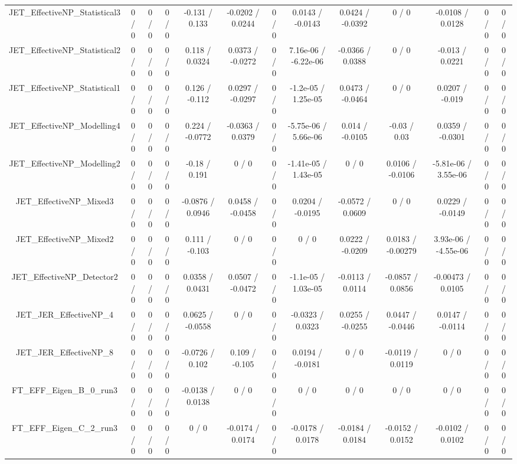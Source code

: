 \documentclass[10pt]{article}
\begin{document}
\begin{table}[htbp]
\begin{center}
\begin{tabular}{|c|c|c|c|c|c|c|c|c|c|c|c|c|}
  JET_EffectiveNP_Statistical3 & 0 / 0 & 0 / 0 & 0 / 0 & -0.131 / 0.133 & -0.0202 / 0.0244 & 0 / 0 & 0.0143 / -0.0143 & 0.0424 / -0.0392 & 0 / 0 & -0.0108 / 0.0128 & 0 / 0 & 0 / 0 \\ 
  JET_EffectiveNP_Statistical2 & 0 / 0 & 0 / 0 & 0 / 0 & 0.118 / 0.0324 & 0.0373 / -0.0272 & 0 / 0 & 7.16e-06 / -6.22e-06 & -0.0366 / 0.0388 & 0 / 0 & -0.013 / 0.0221 & 0 / 0 & 0 / 0 \\ 
  JET_EffectiveNP_Statistical1 & 0 / 0 & 0 / 0 & 0 / 0 & 0.126 / -0.112 & 0.0297 / -0.0297 & 0 / 0 & -1.2e-05 / 1.25e-05 & 0.0473 / -0.0464 & 0 / 0 & 0.0207 / -0.019 & 0 / 0 & 0 / 0 \\ 
  JET_EffectiveNP_Modelling4 & 0 / 0 & 0 / 0 & 0 / 0 & 0.224 / -0.0772 & -0.0363 / 0.0379 & 0 / 0 & -5.75e-06 / 5.66e-06 & 0.014 / -0.0105 & -0.03 / 0.03 & 0.0359 / -0.0301 & 0 / 0 & 0 / 0 \\ 
  JET_EffectiveNP_Modelling2 & 0 / 0 & 0 / 0 & 0 / 0 & -0.18 / 0.191 & 0 / 0 & 0 / 0 & -1.41e-05 / 1.43e-05 & 0 / 0 & 0.0106 / -0.0106 & -5.81e-06 / 3.55e-06 & 0 / 0 & 0 / 0 \\ 
  JET_EffectiveNP_Mixed3 & 0 / 0 & 0 / 0 & 0 / 0 & -0.0876 / 0.0946 & 0.0458 / -0.0458 & 0 / 0 & 0.0204 / -0.0195 & -0.0572 / 0.0609 & 0 / 0 & 0.0229 / -0.0149 & 0 / 0 & 0 / 0 \\ 
  JET_EffectiveNP_Mixed2 & 0 / 0 & 0 / 0 & 0 / 0 & 0.111 / -0.103 & 0 / 0 & 0 / 0 & 0 / 0 & 0.0222 / -0.0209 & 0.0183 / -0.00279 & 3.93e-06 / -4.55e-06 & 0 / 0 & 0 / 0 \\ 
  JET_EffectiveNP_Detector2 & 0 / 0 & 0 / 0 & 0 / 0 & 0.0358 / 0.0431 & 0.0507 / -0.0472 & 0 / 0 & -1.1e-05 / 1.03e-05 & -0.0113 / 0.0114 & -0.0857 / 0.0856 & -0.00473 / 0.0105 & 0 / 0 & 0 / 0 \\ 
  JET_JER_EffectiveNP_4 & 0 / 0 & 0 / 0 & 0 / 0 & 0.0625 / -0.0558 & 0 / 0 & 0 / 0 & -0.0323 / 0.0323 & 0.0255 / -0.0255 & 0.0447 / -0.0446 & 0.0147 / -0.0114 & 0 / 0 & 0 / 0 \\ 
  JET_JER_EffectiveNP_8 & 0 / 0 & 0 / 0 & 0 / 0 & -0.0726 / 0.102 & 0.109 / -0.105 & 0 / 0 & 0.0194 / -0.0181 & 0 / 0 & -0.0119 / 0.0119 & 0 / 0 & 0 / 0 & 0 / 0 \\ 
  FT_EFF_Eigen_B_0_run3 & 0 / 0 & 0 / 0 & 0 / 0 & -0.0138 / 0.0138 & 0 / 0 & 0 / 0 & 0 / 0 & 0 / 0 & 0 / 0 & 0 / 0 & 0 / 0 & 0 / 0 \\ 
  FT_EFF_Eigen_C_2_run3 & 0 / 0 & 0 / 0 & 0 / 0 & 0 / 0 & -0.0174 / 0.0174 & 0 / 0 & -0.0178 / 0.0178 & -0.0184 / 0.0184 & -0.0152 / 0.0152 & -0.0102 / 0.0102 & 0 / 0 & 0 / 0 \\ 

\end{tabular}
\end{center}
\end{table}
\end{document}

